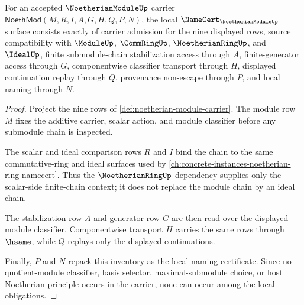 \begin{theorem}\label{thm:noetherian-module-namecert-obligations}
For an accepted $\NoetherianModuleUp$ carrier $\mathsf{NoethMod}(M,R,I,A,G,H,Q,P,N)$, the local $\NameCert_{\NoetherianModuleUp}$ surface consists exactly of carrier admission for the nine displayed rows, source compatibility with $\ModuleUp$, $\CommRingUp$, $\NoetherianRingUp$, and $\IdealUp$, finite submodule-chain stabilization access through $A$, finite-generator access through $G$, componentwise classifier transport through $H$, displayed continuation replay through $Q$, provenance non-escape through $P$, and local naming through $N$.
\end{theorem}
\begin{proof}
Project the nine rows of \autoref{def:noetherian-module-carrier}. The module row $M$ fixes the additive carrier, scalar action, and module classifier before any submodule chain is inspected.

The scalar and ideal comparison rows $R$ and $I$ bind the chain to the same commutative-ring and ideal surfaces used by \autoref{ch:concrete-instances-noetherian-ring-namecert}. Thus the $\NoetherianRingUp$ dependency supplies only the scalar-side finite-chain context; it does not replace the module chain by an ideal chain.

The stabilization row $A$ and generator row $G$ are then read over the displayed module classifier. Componentwise transport $H$ carries the same rows through $\hsame$, while $Q$ replays only the displayed continuations.

Finally, $P$ and $N$ repack this inventory as the local naming certificate. Since no quotient-module classifier, basis selector, maximal-submodule choice, or host Noetherian principle occurs in the carrier, none can occur among the local obligations.
\end{proof}

